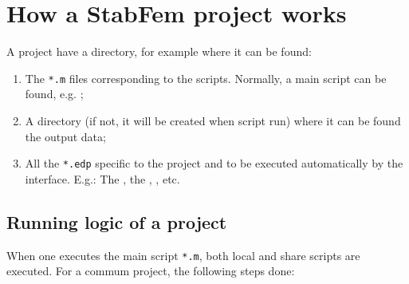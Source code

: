 
\chapter{How a StabFem project works}

A  project have a directory, for example  where it can be found: 
\begin{enumerate}
\item The \texttt{*.m} files corresponding to the  scripts. Normally, a main script can be found, e.g.  ;
\item A directory  (if not, it will be created when  script run) where it can be found the output data;
\item All the \texttt{*.edp} specific to the project and to be executed automatically by the  interface. E.g.: The , the , , etc.
\end{enumerate}



\section{Running logic of a  project}


When one executes the main script \texttt{*.m}, both local and share scripts are executed. For a commum project, the following steps done:


